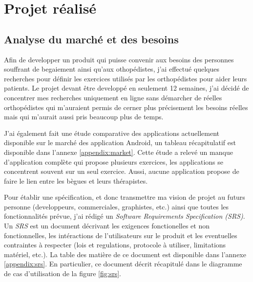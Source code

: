 \chapter{Projet réalisé}

\section{Analyse du marché et des besoins}
Afin de developper un produit qui puisse convenir aux besoins des personnes souffrant de begaiement ainsi qu'aux othopédistes, j'ai effectué quelques recherches pour définir les exercices utilisés par les orthopédistes pour aider leurs patients. Le projet devant être developpé en seulement 12 semaines, j'ai décidé de concentrer mes recherches uniquement en ligne sans démarcher de réelles orthopédistes qui m'auraient permis de cerner plus précisement les besoins réelles mais qui m'aurait aussi pris beaucoup plus de temps.

J'ai également fait une étude comparative des applications actuellement disponible sur le marché des application Android, un tableau récapitulatif est disponible dans l'annexe \ref{appendix:market}. Cette étude a relevé un manque d'application complète qui propose plusieurs exercices, les applications se concentrent souvent sur un seul exercice. Aussi, aucune application propose de faire le lien entre les bègues et leurs thérapistes.

Pour établir une spécification, et donc transmettre
ma vision de projet au futurs personne (developpeurs, commerciales, graphistes, etc.) ainsi que toutes les fonctionnalités prévue, j'ai rédigé un \textit{Software Requirements Specification (SRS)}. Un \textit{SRS} est un document décrivant les exigences fonctionelles et non fonctionnelles, les intéractions de l'utilisateurs sur le produit et les eventuelles contraintes à respecter (lois et regulations, protocole à utiliser, limitations matériel, etc.). La table des matière de ce document est disponible dans l'annexe \ref{appendix:srs}. En particulier, ce document décrit récapitulé dans le diagramme de cas d'utilisation de la figure \ref{fig:srs}.

